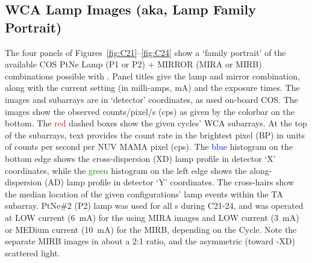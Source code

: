 \subsection{WCA Lamp Images (aka, Lamp Family Portrait) \label{subsec:fportrait} }

The four panels of Figures~\ref{fig:C21}--\ref{fig:C24} show a `family portrait' of the available COS PtNe Lamp (P1 or P2) + MIRROR (MIRA or MIRB)
combinations possible with .
Panel titles give the lamp and mirror combination, along with the current setting (in milli-amps, mA) and the exposure times.
The images and subarrays are in `detector' coordinates, as used on-board COS.
The images show the observed counts/pixel/s (cps) as given by the colorbar on the bottom.
The \textcolor{red}{red} dashed boxes show the given cycles'  WCA subarrays. At the top of the subarrays, text provides the count rate in the brightest pixel (BP) in units of counts per second per NUV MAMA pixel (cps).
The \textcolor{blue}{blue} histogram on the bottom edge shows the cross-dispersion (XD) lamp profile in detector `X' coordinates, while
the \textcolor{green}{green} histogram on the left edge shows the along-dispersion (AD) lamp profile in detector `Y' coordinates.
The cross-hairs show the median location of the given configurations' lamp events within the TA subarray.
PtNe\#2 (P2) lamp was used for all s during C21-24, and was operated at LOW current (6~mA) for the using MIRA images
and LOW current (3~mA) or MEDium current (10~mA) for the MIRB, depending on the Cycle. Note the separate MIRB images in about a 2:1 ratio, and the asymmetric
(toward -XD) scattered light.

